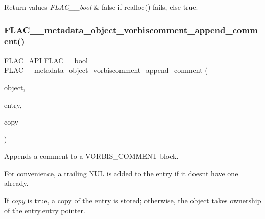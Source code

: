\begin{DoxyRetVals}{Return values}
{\em F\+L\+A\+C\+\_\+\+\_\+bool} & {\ttfamily false} if realloc() fails, else {\ttfamily true}. \\
\hline
\end{DoxyRetVals}
\mbox{\label{group__flac__metadata__object_gad04ef80ae5f852db8f3729a6ef8c1631}} 
\subsubsection{\texorpdfstring{F\+L\+A\+C\+\_\+\+\_\+metadata\+\_\+object\+\_\+vorbiscomment\+\_\+append\+\_\+comment()}{FLAC\_\_metadata\_object\_vorbiscomment\_append\_comment()}}
{\footnotesize\ttfamily \hyperlink{group__flac__export_ga56ca07df8a23310707732b1c0007d6f5}{F\+L\+A\+C\+\_\+\+A\+PI} \hyperlink{ordinals_8h_a95103469f1cbd78b8cf250194985b34e}{F\+L\+A\+C\+\_\+\+\_\+bool} F\+L\+A\+C\+\_\+\+\_\+metadata\+\_\+object\+\_\+vorbiscomment\+\_\+append\+\_\+comment (\begin{DoxyParamCaption}\item[{\hyperlink{struct_f_l_a_c_____stream_metadata}{F\+L\+A\+C\+\_\+\+\_\+\+Stream\+Metadata} $\ast$}]{object,  }\item[{\hyperlink{struct_f_l_a_c_____stream_metadata___vorbis_comment___entry}{F\+L\+A\+C\+\_\+\+\_\+\+Stream\+Metadata\+\_\+\+Vorbis\+Comment\+\_\+\+Entry}}]{entry,  }\item[{\hyperlink{ordinals_8h_a95103469f1cbd78b8cf250194985b34e}{F\+L\+A\+C\+\_\+\+\_\+bool}}]{copy }\end{DoxyParamCaption})}

Appends a comment to a V\+O\+R\+B\+I\+S\+\_\+\+C\+O\+M\+M\+E\+NT block.

For convenience, a trailing N\+UL is added to the entry if it doesn\textquotesingle{}t have one already.

If {\itshape copy} is {\ttfamily true}, a copy of the entry is stored; otherwise, the object takes ownership of the {\ttfamily entry.\+entry} pointer.

